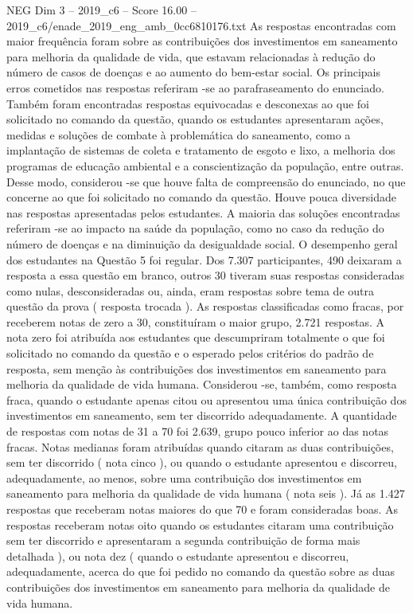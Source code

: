 \begin{textsample}{NEG Dim 3 – 2019\_c6 – Score 16.00 – 2019\_c6/enade\_2019\_eng\_amb\_0cc6810176.txt}
As respostas encontradas com maior frequência foram sobre as contribuições dos investimentos em saneamento para melhoria da qualidade de vida, que estavam relacionadas à redução do número de casos de doenças e ao aumento do bem-estar social.
Os principais erros cometidos nas respostas referiram -se ao parafraseamento do enunciado.
Também foram encontradas respostas equivocadas e desconexas ao que foi solicitado no comando da questão, quando os estudantes apresentaram ações, medidas e soluções de combate à problemática do saneamento, como a implantação de sistemas de coleta e tratamento de esgoto e lixo, a melhoria dos programas de educação ambiental e a conscientização da população, entre outras.
Desse modo, considerou -se que houve falta de compreensão do enunciado, no que concerne ao que foi solicitado no comando da questão.
Houve pouca diversidade nas respostas apresentadas pelos estudantes.
A maioria das soluções encontradas referiram -se ao impacto na saúde da população, como no caso da redução do número de doenças e na diminuição da desigualdade social.
O desempenho geral dos estudantes na Questão 5 foi regular.
Dos 7.307 participantes, 490 deixaram a resposta a essa questão em branco, outros 30 tiveram suas respostas consideradas como nulas, desconsideradas ou, ainda, eram respostas sobre tema de outra questão da prova ( resposta trocada ).
As respostas classificadas como fracas, por receberem notas de zero a 30, constituíram o maior grupo, 2.721 respostas.
A nota zero foi atribuída aos estudantes que descumpriram totalmente o que foi solicitado no comando da questão e o esperado pelos critérios do padrão de resposta, sem menção às contribuições dos investimentos em saneamento para melhoria da qualidade de vida humana.
Considerou -se, também, como resposta fraca, quando o estudante apenas citou ou apresentou uma única contribuição dos investimentos em saneamento, sem ter discorrido adequadamente.
A quantidade de respostas com notas de 31 a 70 foi 2.639, grupo pouco inferior ao das notas fracas.
Notas medianas foram atribuídas quando citaram as duas contribuições, sem ter discorrido ( nota cinco ), ou quando o estudante apresentou e discorreu, adequadamente, ao menos, sobre uma contribuição dos investimentos em saneamento para melhoria da qualidade de vida humana ( nota seis ).
Já as 1.427 respostas que receberam notas maiores do que 70 e foram consideradas boas.
As respostas receberam notas oito quando os estudantes citaram uma contribuição sem ter discorrido e apresentaram a segunda contribuição de forma mais detalhada ), ou nota dez ( quando o estudante apresentou e discorreu, adequadamente, acerca do que foi pedido no comando da questão sobre as duas contribuições dos investimentos em saneamento para melhoria da qualidade de vida humana.

\end{textsample}
